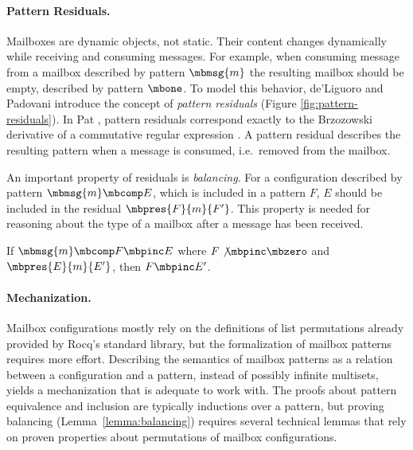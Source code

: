 \paragraph{Pattern Residuals.}
Mailboxes are dynamic objects, not static.
Their content changes dynamically while receiving and consuming messages.
For example, when consuming message  from a mailbox described by pattern $\mbmsg{m}$ the resulting mailbox should be empty,
described by pattern $\mbone$.
To model this behavior, de'Liguoro and Padovani introduce the concept of \emph{pattern residuals} \cite{deliguoroMailboxTypesUnordered2018} (Figure \ref{fig:pattern-residuals}).
In Pat \cite{fowlerSpecialDeliveryProgramming2023a}, pattern residuals correspond exactly to the Brzozowski
derivative of a commutative regular expression \cite{brzozowskiDerivativesRegularExpressions1964}.
A pattern residual describes the resulting pattern when a message is consumed, i.e.\ removed from the mailbox.

An important property of residuals is \emph{balancing}.
For a configuration described by pattern $\mbmsg{m} \mbcomp E$, which is included in a pattern $F$, $E$ should be included in the residual $\mbpres{F}{m}{F'}$.
This property is needed for reasoning about the type of a mailbox after a
message has been received.

\begin{lemma}
  If $\mbmsg{m} \mbcomp F \mbpinc E$ where $F \not\mbpinc \mbzero$ and $\mbpres{E}{m}{E'}$, then $F \mbpinc E'$.
  \label{lemma:balancing}
\end{lemma}

\paragraph{Mechanization.}
Mailbox configurations mostly rely on the definitions of list permutations
already provided by Rocq's standard library, but the formalization of mailbox
patterns requires more effort.
Describing the semantics of mailbox patterns as a relation between a configuration
and a pattern, instead of possibly infinite multisets, yields a mechanization that
is adequate to work with.  The proofs about pattern equivalence and inclusion
are typically inductions over a pattern, but proving balancing
(Lemma~\ref{lemma:balancing}) requires several technical lemmas that rely on
proven properties about permutations of mailbox configurations.

